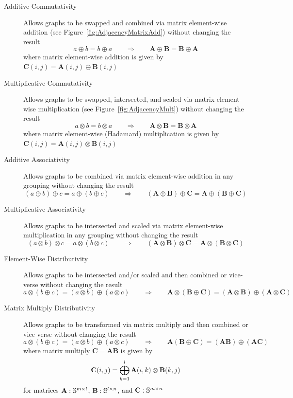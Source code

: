 \begin{description}
\item[Additive Commutativity] Allows graphs to be swapped and combined via matrix element-wise addition (see Figure~\ref{fig:AdjacencyMatrixAdd}) without changing the result
  $$
      a \oplus b = b \oplus a  ~~~~~~~~~ \Rightarrow ~~~~~~~~~
      \mathbf{A} \oplus \mathbf{B} = \mathbf{B} \oplus \mathbf{A}
  $$
  where matrix element-wise addition is given by
     $\mathbf{C}(i,j) = \mathbf{A}(i,j) \oplus \mathbf{B}(i,j)$
     
\item[Multiplicative Commutativity] Allows graphs to be swapped, intersected, and scaled via matrix element-wise multiplication (see Figure~\ref{fig:AdjacencyMult}) without changing the result
  $$
      a \otimes b = b \otimes a  ~~~~~~~~~ \Rightarrow ~~~~~~~~~
      \mathbf{A} \otimes \mathbf{B} = \mathbf{B} \otimes \mathbf{A}
  $$
    where matrix element-wise (Hadamard) multiplication is given by
     $\mathbf{C}(i,j) = \mathbf{A}(i,j) \otimes \mathbf{B}(i,j)$

\item[Additive Associativity] Allows graphs to be combined via matrix element-wise addition in any grouping without changing the result
  $$
      (a \oplus b) \oplus c = a \oplus (b \oplus c)   ~~~~~~~~~ \Rightarrow ~~~~~~~~~
      (\mathbf{A} \oplus \mathbf{B}) \oplus \mathbf{C} = \mathbf{A} \oplus (\mathbf{B} \oplus \mathbf{C})
  $$

\item[Multiplicative Associativity] Allows graphs to be intersected and scaled via matrix element-wise multiplication in any grouping without changing the result
  $$
      (a \otimes b) \otimes c = a \otimes (b \otimes c)   ~~~~~~~~~ \Rightarrow ~~~~~~~~~
      (\mathbf{A} \otimes \mathbf{B}) \otimes \mathbf{C} = \mathbf{A} \otimes (\mathbf{B} \otimes \mathbf{C})
  $$

\item[Element-Wise Distributivity] Allows graphs to be intersected and/or scaled and then combined or vice-verse without changing the result
  $$
      a \otimes (b \oplus c) = (a \otimes b) \oplus (a \otimes c)   ~~~~~~~~~ \Rightarrow ~~~~~~~~~
      \mathbf{A} \otimes (\mathbf{B} \oplus \mathbf{C}) = (\mathbf{A} \otimes \mathbf{B}) \oplus (\mathbf{A} \otimes \mathbf{C})
  $$

\item[Matrix Multiply Distributivity] Allows graphs to be transformed via matrix multiply and then combined or vice-verse without changing the result
  $$
      a \otimes (b \oplus c) = (a \otimes b) \oplus (a \otimes c)   ~~~~~~~~~ \Rightarrow ~~~~~~~~~
      \mathbf{A} (\mathbf{B} \oplus \mathbf{C}) = (\mathbf{A} \mathbf{B}) \oplus (\mathbf{A} \mathbf{C})
  $$
  where matrix multiply $\mathbf{C} = \mathbf{A} \mathbf{B}$ is given by
  $$
   {\bf C}(i,j) = \bigoplus_{k=1}^l {\bf A}(i,k) \otimes {\bf B}(k,j)
  $$
  for matrices  ${\bf A}: \mathbb{S}^{m \times l}$,  ${\bf B}: \mathbb{S}^{l \times n}$, and ${\bf C}: \mathbb{S}^{m \times n}$


\end{description}
